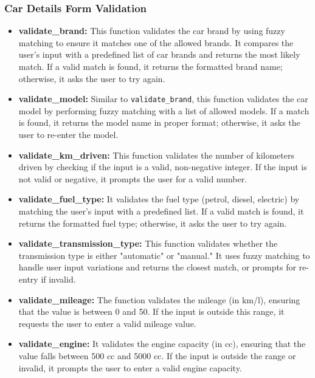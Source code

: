 \documentclass[a4paper,12pt]{article}
\begin{document}
\subsubsection{Car Details Form Validation}

\begin{itemize}
	\item \textbf{validate\_brand:} 
	This function validates the car brand by using fuzzy matching to ensure it matches one of the allowed brands. It compares the user's input with a predefined list of car brands and returns the most likely match. If a valid match is found, it returns the formatted brand name; otherwise, it asks the user to try again.
	
	\item \textbf{validate\_model:} 
	Similar to \texttt{validate\_brand}, this function validates the car model by performing fuzzy matching with a list of allowed models. If a match is found, it returns the model name in proper format; otherwise, it asks the user to re-enter the model.
	
	\item \textbf{validate\_km\_driven:} 
	This function validates the number of kilometers driven by checking if the input is a valid, non-negative integer. If the input is not valid or negative, it prompts the user for a valid number.
	
	\item \textbf{validate\_fuel\_type:} 
	It validates the fuel type (petrol, diesel, electric) by matching the user's input with a predefined list. If a valid match is found, it returns the formatted fuel type; otherwise, it asks the user to try again.
	
	\item \textbf{validate\_transmission\_type:} 
	This function validates whether the transmission type is either "automatic" or "manual." It uses fuzzy matching to handle user input variations and returns the closest match, or prompts for re-entry if invalid.
	
	\item \textbf{validate\_mileage:} 
	The function validates the mileage (in km/l), ensuring that the value is between 0 and 50. If the input is outside this range, it requests the user to enter a valid mileage value.
	
	\item \textbf{validate\_engine:} 
	It validates the engine capacity (in cc), ensuring that the value falls between 500 cc and 5000 cc. If the input is outside the range or invalid, it prompts the user to enter a valid engine capacity.
	

\end{itemize}
\end{document}
